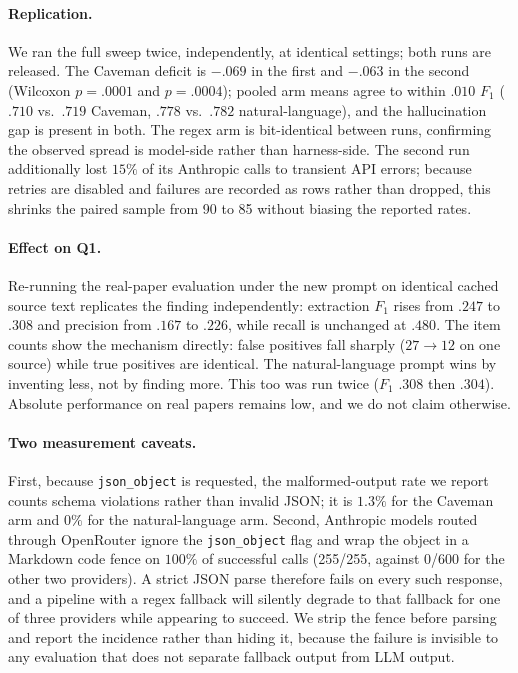 \documentclass[letterpaper]{article} %
\begin{document}
\paragraph{Replication.} We ran the full sweep twice, independently, at identical
settings; both runs are released. The Caveman deficit is $-.069$ in the first and
$-.063$ in the second (Wilcoxon $p=.0001$ and $p=.0004$); pooled arm means agree
to within $.010$ $F_1$ ($.710$ vs.\ $.719$ Caveman, $.778$ vs.\ $.782$
natural-language), and the hallucination gap is present in both. The regex arm is
bit-identical between runs, confirming the observed spread is model-side rather
than harness-side. The second run additionally lost $15\%$ of its Anthropic calls
to transient API errors; because retries are disabled and failures are recorded
as rows rather than dropped, this shrinks the paired sample from 90 to 85 without
biasing the reported rates.

\paragraph{Effect on Q1.} Re-running the real-paper evaluation under the new
prompt on identical cached source text replicates the finding independently:
extraction $F_1$ rises from $.247$ to $.308$ and precision from $.167$ to $.226$,
while recall is unchanged at $.480$. The item counts show the mechanism directly:
false positives fall sharply ($27 \rightarrow 12$ on one source) while true
positives are identical. The natural-language prompt wins by inventing less, not
by finding more. This too was run twice ($F_1$ $.308$ then $.304$). Absolute
performance on real papers remains low, and we do not claim otherwise.

\paragraph{Two measurement caveats.} First, because \texttt{json\_object} is
requested, the malformed-output rate we report counts schema violations rather
than invalid JSON; it is $1.3\%$ for the Caveman arm and $0\%$ for the
natural-language arm. Second, Anthropic models routed through OpenRouter ignore
the \texttt{json\_object} flag and wrap the object in a Markdown code fence on
$100\%$ of successful calls (255/255, against 0/600 for the other two providers).
A strict JSON parse therefore fails on every such response, and a pipeline with a
regex fallback will silently degrade to that fallback for one of three providers
while appearing to succeed. We strip the fence before parsing and report the
incidence rather than hiding it, because the failure is invisible to any
evaluation that does not separate fallback output from LLM output.
\end{document}
